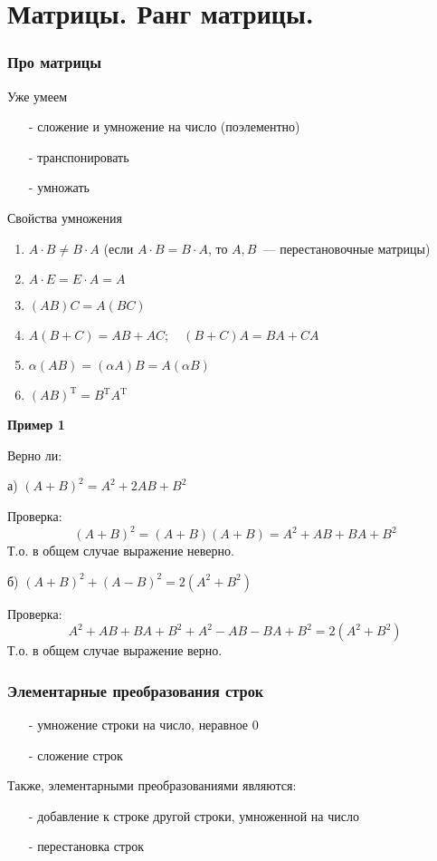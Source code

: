 \renewcommand{\thepart}{\arabic{part}}
\part{Матрицы. Ранг матрицы.}
\section{Про матрицы}
Уже умеем
\begin{itemize}
	\item[-] сложение и умножение на число (поэлементно)
	\item[-] транспонировать
	\item[-] умножать
\end{itemize}

Свойства умножения
\renewcommand{\labelenumi}{\arabic{enumi}.\!\degree}
\begin{enumerate}
	\item $A \cdot B \neq B\cdot A$ (если $A \cdot B = B\cdot A$, то $A,B$~--- перестановочные матрицы)
	\item $A\cdot E= E\cdot A = A$
	\item $(AB)C=A(BC)$
	\item $A(B+C)=AB+AC;\quad (B+C)A=BA+CA$
	\item $\alpha (AB)=(\alpha A)B=A(\alpha B)$
	\item $(AB)^\mathrm{T}=B^\mathrm{T}A^\mathrm{T}$
\end{enumerate}
\textbf{Пример 1}

Верно ли:

а) $(A+B)^2=A^2+2AB+B^2$

Проверка:
$$(A+B)^2=(A+B)(A+B)=A^2+AB+BA+B^2$$
Т.о. в общем случае выражение неверно.

б) $(A+B)^2+(A-B)^2=2(A^2+B^2)$

Проверка:
$$A^2+AB+BA+B^2+A^2-AB-BA+B^2=2(A^2+B^2)$$
Т.о. в общем случае выражение верно.
\section{Элементарные преобразования строк}
\begin{itemize}
	\item[-] умножение строки на число, неравное 0
	\item[-] сложение строк
\end{itemize}
Также, элементарными преобразованиями являются:
\begin{itemize}
	\item[-] добавление к строке другой строки, умноженной на число
	\item[-] перестановка строк
\end{itemize}

